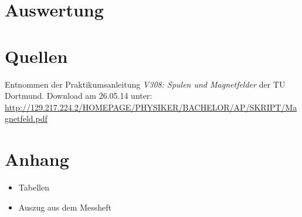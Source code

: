 \documentclass[11pt,ngerman,a4paper]{article}
\begin{document}
\section{Auswertung}

\section{Quellen}
\begin{enumerate}[{[}1{]}]
\item Entnommen der Praktikumsanleitung \textit{V308: Spulen und Magnetfelder} der TU Dortmund. Download am 26.05.14 unter:\\
 \url{http://129.217.224.2/HOMEPAGE/PHYSIKER/BACHELOR/AP/SKRIPT/Magnetfeld.pdf}
\end{enumerate}

\section{Anhang}
\begin{itemize}
\item Tabellen
\item Auszug aus dem Messheft
\end{itemize}
\end{document}
